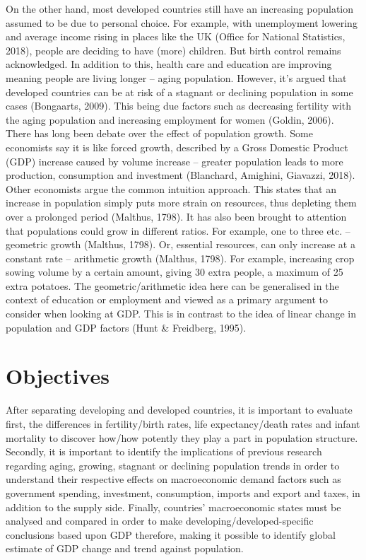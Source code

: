 \documentclass[11pt, english]{article}
\begin{document}
	On the other hand, most developed countries still have an increasing population assumed to be due to personal choice. For example, with unemployment lowering and average income rising in places like the UK (Office for National Statistics, 2018), people are deciding to have (more) children. But birth control remains acknowledged. In addition to this, health care and education are improving meaning people are living longer – aging population. However, it’s argued that developed countries can be at risk of a stagnant or declining population in some cases (Bongaarts, 2009). This being due factors such as decreasing fertility with the aging population and increasing employment for women (Goldin, 2006).\\

	There has long been debate over the effect of population growth. Some economists say it is like forced growth, described by a Gross Domestic Product (GDP) increase caused by volume increase – greater population leads to more production, consumption and investment (Blanchard, Amighini, Giavazzi, 2018). Other economists argue the common intuition approach. This states that an increase in population simply puts more strain on resources, thus depleting them over a prolonged period (Malthus, 1798). It has also been brought to attention that populations could grow in different ratios. For example, one to three etc. – geometric growth (Malthus, 1798). Or, essential resources, can only increase at a constant rate – arithmetic growth (Malthus, 1798). For example, increasing crop sowing volume by a certain amount, giving 30 extra people, a maximum of 25 extra potatoes. The geometric/arithmetic idea here can be generalised in the context of education or employment and viewed as a primary argument to consider when looking at GDP. This is in contrast to the idea of linear change in population and GDP factors (Hunt \& Freidberg, 1995).

\newpage

\section{Objectives}

	After separating developing and developed countries, it is important to evaluate first, the differences in fertility/birth rates, life expectancy/death rates and infant mortality to discover how/how potently they play a part in population structure. Secondly, it is important to identify the implications of previous research regarding aging, growing, stagnant or declining population trends in order to understand their respective effects on macroeconomic demand factors such as government spending, investment, consumption, imports and export and taxes, in addition to the supply side. Finally, countries’ macroeconomic states must be analysed and compared in order to make developing/developed-specific conclusions based upon GDP therefore, making it possible to identify global estimate of GDP change and trend against population.\\
\end{document}
